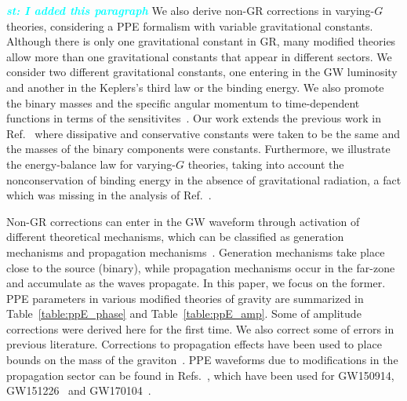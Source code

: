\documentclass[prd,twocolumn,nofootinbib]{revtex4-1}
\newcommand{\st}[1]{\textcolor{cyan}{\it{\textbf{st: #1}}} }
\begin{document}
\st{I added this paragraph}
We also derive non-GR corrections in varying-$G$ theories, considering a PPE formalism with variable gravitational constants. Although there is only one gravitational constant in GR, many modified theories allow more than one gravitational constants that appear in different sectors. We consider two different gravitational constants, one entering in the GW luminosity and another in the Keplers's third law or the binding energy. We also promote the binary  masses and the specific angular momentum to time-dependent functions in terms of the sensitivites~\cite{PhysRevLett.65.953}. Our work extends the previous work in Ref.~\cite{Yunes:2009bv} where dissipative and conservative constants were taken to be the same and the masses of the binary components were constants. Furthermore, we illustrate the energy-balance law for varying-$G$ theories, taking into account the nonconservation of binding energy in the absence of gravitational radiation, a fact which was missing in the analysis of Ref.~\cite{Yunes:2009bv}.


Non-GR corrections can enter in the GW waveform through activation of different theoretical mechanisms, which can be classified as generation mechanisms and propagation mechanisms~\cite{Yunes:2016jcc}. Generation mechanisms take place close to the source (binary), while propagation mechanisms occur in the far-zone and accumulate as the waves propagate. In this paper, we focus on the former. PPE parameters in various modified theories of gravity are summarized in Table~\ref{table:ppE_phase} and Table~\ref{table:ppE_amp}.
Some of amplitude corrections were derived here for the first time. We also correct some of errors in previous literature.
Corrections to propagation effects have been used to place bounds on the mass of the graviton~\cite{Monitor:2017mdv}.
PPE waveforms due to modifications in the propagation sector can be found in Refs.~\cite{Mirshekari:2011yq,Yunes:2016jcc,Nishizawa:2017nef}, which have been used for GW150914, GW151226~\cite{Yunes:2016jcc} and GW170104~\cite{Abbott:2017vtc}. 
\end{document}
